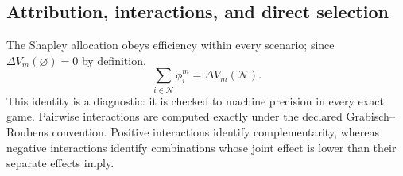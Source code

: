\documentclass[review]{elsarticle}
\theoremstyle{plain}
\theoremstyle{definition}
\theoremstyle{remark}
\newcommand{\Players}{\mathcal{N}}
\newcommand{\Utility}{V}
\newcommand{\Shap}{\phi}
\begin{document}
\subsection{Attribution, interactions, and direct selection}

The Shapley allocation obeys efficiency within every scenario; since $\Delta\Utility_m(\varnothing)=0$ by definition,
\begin{equation}
 \sum_{i\in\Players}\Shap_i^m=\Delta\Utility_m(\Players).
\label{eq:efficiency}
\end{equation}
This identity is a diagnostic: it is checked to machine precision in every exact game. Pairwise interactions are computed exactly under the declared Grabisch--Roubens convention. Positive interactions identify complementarity, whereas negative interactions identify combinations whose joint effect is lower than their separate effects imply.
\end{document}
